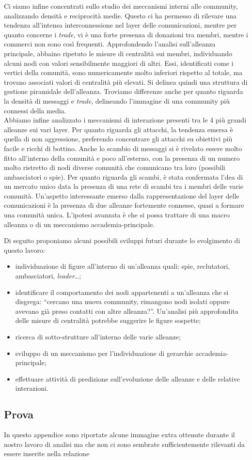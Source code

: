 Ci siamo infine concentrati sullo studio dei meccanismi interni alle community, analizzando densità e reciprocità medie. Questo ci ha permesso di rilevare una tendenza all'intensa interconnessione nel layer delle comunicazioni, mentre per quanto concerne i \textit{trade}, vi è una forte presenza di donazioni tra membri, mentre i commerci non sono così frequenti.
Approfondendo l'analisi sull'alleanza principale, abbaino ripetuto le misure di centralità sui membri, individuando alcuni nodi con valori sensibilmente maggiori di altri. Essi, identificati come i vertici della comunità, sono numericamente molto inferiori rispetto al totale, ma trovano associati valori di centralità più elevati. Si delinea quindi una struttura di gestione piramidale dell'alleanza. Troviamo differenze anche per quanto riguarda la densità di messaggi e \textit{trade}, delineando l'immagine di una community più connessi della media.\\
Abbiamo infine analizzato i meccanismi di interazione presenti tra le 4 più grandi alleanze sui vari layer. Per quanto riguarda gli attacchi, la tendenza emersa è quella di non aggressione, preferendo concentrare gli attacchi su obiettivi più facile e ricchi di bottino. Anche lo scambio di messaggi si è rivelato essere molto fitto all'interno della comunità e poco all'esterno, con la presenza di un numero molto ristretto di nodi diverse comunità che comunicano tra loro (possibili ambasciatori o spie). Per quanto riguarda gli scambi, è stata confermata l'dea di un mercato unico data la presenza di una rete di scambi tra i membri delle varie comunità. Un'aspetto interessante emerso dalla rappresentazione del layer delle comunicazioni è la presenza di due alleanze fortemente connesse, quasi a formare una comunità unica. L'ipotesi avanzata è che si possa trattare di una macro alleanza o di un meccanismo accademia-principale.

Di seguito proponiamo alcuni possibili sviluppi futuri durante lo svolgimento di questo lavoro:
\begin{itemize}
	\item individuazione di figure all'interno di un'alleanza quali: spie, reclutatori, ambasciatori, \textit{leader}\dots;
	\item identificare il comportamento dei nodi appartenenti a un'alleanza che si disgrega: “cercano una nuova community, rimangono nodi isolati oppure avevano già preso contatti con altre alleanza?”. Un'analisi più approfondita delle misure di centralità potrebbe suggerire le figure sospette;
	\item ricerca di sotto-strutture all'interno delle varie alleanze;
	\item sviluppo di un meccanismo per l'individuazione di gerarchie accademia-principale;
	\item effettuare attività di predizione sull'evoluzione delle alleanze e delle relative interazioni.
\end{itemize}

\begin{appendices}
\section{Prova}
In questo appendice sono riportate alcune immagine extra ottenute durante il nostro lavoro di analisi ma che non ci sono sembrate sufficientemente rilevanti da essere inserite nella relazione


\end{appendices}
